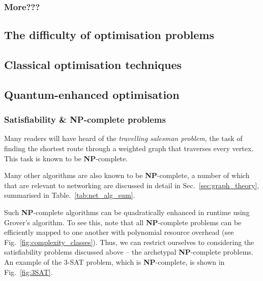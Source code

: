 
\subsubsection{More???}


\subsection{The difficulty of optimisation problems}


\subsection{Classical optimisation techniques}

\subsection{Quantum-enhanced optimisation}

\subsubsection{Satisfiability \& \textbf{NP}-complete problems}

Many readers will have heard of the \textit{travelling salesman problem}, the task of finding the shortest route through a weighted graph that traverses every vertex. This task is known to be \textbf{NP}-complete.

Many other algorithms are also known to be \textbf{NP}-complete, a number of which that are relevant to networking are discussed in detail in Sec.~\ref{sec:graph_theory}, summarised in Table.~\ref{tab:net_alg_sum}.

Such \textbf{NP}-complete algorithms can be quadratically enhanced in runtime using Grover's algorithm. To see this, note that all \textbf{NP}-complete problems can be efficiently mapped to one another with polynomial resource overhead (see Fig.~\ref{fig:complexity_classes}). Thus, we can restrict ourselves to considering the satisfiability problems discussed above -- the archetypal \textbf{NP}-complete problems. An example of the 3-\textsc{SAT} problem, which is \textbf{NP}-complete, is shown in Fig.~\ref{fig:3SAT}.

